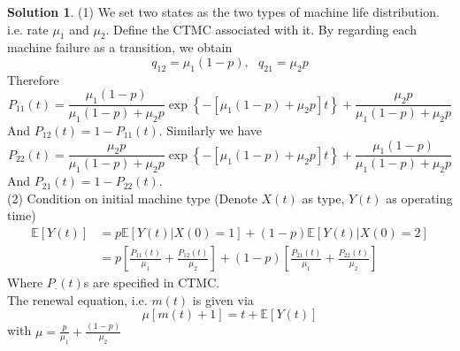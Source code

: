 \documentclass[a4paper, 10pt]{article}
\theoremstyle{definition}
\theoremstyle{hSol}
\newtheorem*{solution}{Solution}
\begin{document}
\begin{solution} (1) We set two states as the two types of machine life distribution. i.e. rate $\mu_1$ and $\mu_2$. Define the CTMC associated with it. By regarding each machine failure as a transition, we obtain
\begin{equation}
  q_{12} = \mu_1(1-p),~~~q_{21}=\mu_2 p
\end{equation}
Therefore
\begin{equation}
  P_{11}(t) = \frac{\mu_1(1-p)}{\mu_1(1-p)+\mu_2 p}\exp\left\{-[\mu_1(1-p)+\mu_2 p]t\right\} + \frac{\mu_2 p}{\mu_1 (1-p)+\mu_2 p}
\end{equation}
And $P_{12}(t)=1-P_{11}(t)$. Similarly we have
\begin{equation}
  P_{22}(t) = \frac{\mu_2 p}{\mu_1(1-p)+\mu_2 p}\exp\left\{-[\mu_1(1-p)+\mu_2 p]t\right\} + \frac{\mu_1(1-p)}{\mu_1 (1-p)+\mu_2 p}
\end{equation}
And $P_{21}(t)=1-P_{22}(t)$. \\
(2) Condition on initial machine type (Denote $X(t)$ as type, $Y(t)$ as operating time)
\begin{equation}
  \begin{split}
    \mathbb{E}\left[Y(t)\right] &= p\mathbb{E}\left[Y(t)|X(0)=1\right] + (1-p) \mathbb{E}\left[Y(t)|X(0)=2\right] \\
    &= p\left[\frac{P_{11}(t)}{\mu_1}+\frac{P_{12}(t)}{\mu_2}\right] + (1-p)\left[\frac{P_{21}(t)}{\mu_1}+\frac{P_{22}(t)}{\mu_2}\right]
  \end{split}
\end{equation}
Where $P_{\cdot}(t)$s are specified in CTMC. \\
The renewal equation, i.e. $m(t)$ is given via
\begin{equation}
  \mu[m(t)+1] = t+\mathbb{E}\left[Y(t)\right]
\end{equation}
with $\mu=\frac{p}{\mu_1}+\frac{(1-p)}{\mu_2}$
\end{solution}
\end{document}
